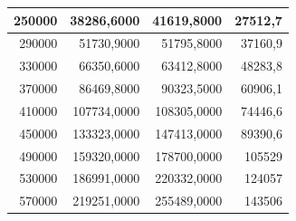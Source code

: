 \documentclass[a4paper, 12pt]{article}
\begin{document}
\begin{longtable}[c]{@{}rrrr@{}}
	\multicolumn{1}{|r|}{250000}                  & \multicolumn{1}{r|}{38286,6000}             & \multicolumn{1}{r|}{41619,8000}                                                        & \multicolumn{1}{r|}{27512,7}                                                           \\* \midrule
	\multicolumn{1}{|r|}{290000}                  & \multicolumn{1}{r|}{51730,9000}             & \multicolumn{1}{r|}{51795,8000}                                                        & \multicolumn{1}{r|}{37160,9}                                                           \\* \midrule
	\multicolumn{1}{|r|}{330000}                  & \multicolumn{1}{r|}{66350,6000}             & \multicolumn{1}{r|}{63412,8000}                                                        & \multicolumn{1}{r|}{48283,8}                                                           \\* \midrule
	\multicolumn{1}{|r|}{370000}                  & \multicolumn{1}{r|}{86469,8000}             & \multicolumn{1}{r|}{90323,5000}                                                        & \multicolumn{1}{r|}{60906,1}                                                           \\* \midrule
	\multicolumn{1}{|r|}{410000}                  & \multicolumn{1}{r|}{107734,0000}            & \multicolumn{1}{r|}{108305,0000}                                                       & \multicolumn{1}{r|}{74446,6}                                                           \\* \midrule
	\multicolumn{1}{|r|}{450000}                  & \multicolumn{1}{r|}{133323,0000}            & \multicolumn{1}{r|}{147413,0000}                                                       & \multicolumn{1}{r|}{89390,6}                                                           \\* \midrule
	\multicolumn{1}{|r|}{490000}                  & \multicolumn{1}{r|}{159320,0000}            & \multicolumn{1}{r|}{178700,0000}                                                       & \multicolumn{1}{r|}{105529}                                                            \\* \midrule
	\multicolumn{1}{|r|}{530000}                  & \multicolumn{1}{r|}{186991,0000}            & \multicolumn{1}{r|}{220332,0000}                                                       & \multicolumn{1}{r|}{124057}                                                            \\* \midrule
	\multicolumn{1}{|r|}{570000}                  & \multicolumn{1}{r|}{219251,0000}            & \multicolumn{1}{r|}{255489,0000}                                                       & \multicolumn{1}{r|}{143506}                                                            \\* \midrule

\end{longtable}
\end{document}
